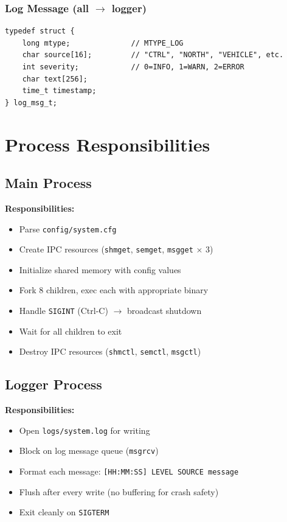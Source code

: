 \documentclass[11pt,a4paper]{article}
\begin{document}
\subsubsection{Log Message (all $\rightarrow$ logger)}
\begin{lstlisting}
typedef struct {
    long mtype;              // MTYPE_LOG
    char source[16];         // "CTRL", "NORTH", "VEHICLE", etc.
    int severity;            // 0=INFO, 1=WARN, 2=ERROR
    char text[256];
    time_t timestamp;
} log_msg_t;
\end{lstlisting}

\newpage
\section{Process Responsibilities}

\subsection{Main Process}
\textbf{Responsibilities:}
\begin{itemize}[noitemsep]
    \item Parse \texttt{config/system.cfg}
    \item Create IPC resources (\texttt{shmget}, \texttt{semget}, \texttt{msgget} $\times$ 3)
    \item Initialize shared memory with config values
    \item Fork 8 children, exec each with appropriate binary
    \item Handle \texttt{SIGINT} (Ctrl-C) $\rightarrow$ broadcast shutdown
    \item Wait for all children to exit
    \item Destroy IPC resources (\texttt{shmctl}, \texttt{semctl}, \texttt{msgctl})
\end{itemize}

\subsection{Logger Process}
\textbf{Responsibilities:}
\begin{itemize}[noitemsep]
    \item Open \texttt{logs/system.log} for writing
    \item Block on log message queue (\texttt{msgrcv})
    \item Format each message: \texttt{[HH:MM:SS] LEVEL SOURCE message}
    \item Flush after every write (no buffering for crash safety)
    \item Exit cleanly on \texttt{SIGTERM}
\end{itemize}
\end{document}
